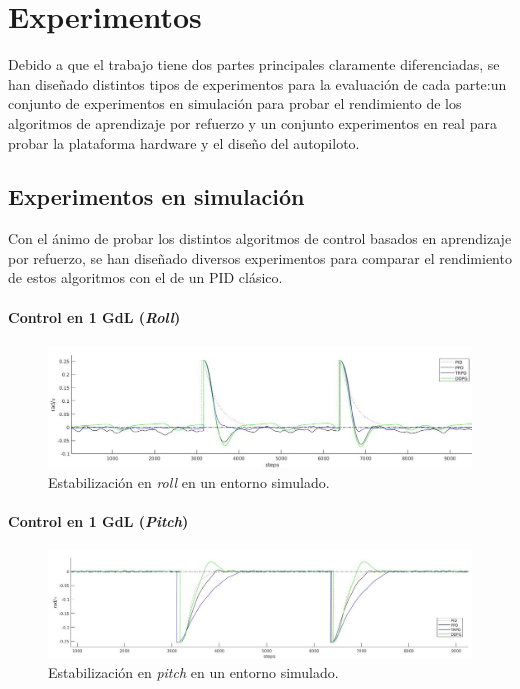 \chapter{Experimentos}
Debido a que el trabajo tiene dos partes principales claramente diferenciadas, se han diseñado distintos tipos de experimentos para la evaluación de cada parte:un conjunto de experimentos en simulación para probar el rendimiento de los algoritmos de aprendizaje por refuerzo y un conjunto experimentos en real para probar la plataforma hardware y el diseño del autopiloto.
\section{Experimentos en simulación}
Con el ánimo de probar los distintos algoritmos de control basados en aprendizaje por refuerzo, se han diseñado diversos experimentos para comparar el rendimiento de estos algoritmos con el de un PID clásico. 
\subsubsection{Control en 1 GdL (\textit{Roll})}


\begin{figure}[htb!]
	\centering
	\includegraphics[width=\textwidth]{experimentos/sim_onlyroll}
	\caption{Estabilización en \textit{roll} en un entorno simulado.}
	\label{mat_lab_graph}	
\end{figure}

\subsubsection{Control en 1 GdL (\textit{Pitch})}
\begin{figure}[htb!]
	\centering
	\includegraphics[width=\textwidth]{experimentos/sim_onlypitch}
	\caption{Estabilización en \textit{pitch} en un entorno simulado.}
	\label{mat_lab_graph}	
\end{figure}

